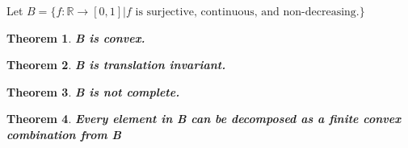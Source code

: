 \documentclass[12pt]{extarticle}
\theoremstyle{plain}
\newtheorem{thm}{Theorem}[section]
\theoremstyle{Definition}
\theoremstyle{Definition}
\theoremstyle{plain}
\begin{document}
	Let $B = \{f : \mathbb{R} \to [0,1] | f \text{ is surjective, continuous, and non-decreasing.}\}$ \\ 
	\begin{thm} \textbf{B is convex. } \\
		
	\end{thm}
	\begin{thm} \textbf{B is translation invariant.} \\
	
	\end{thm}
	\begin{thm} \textbf{B is not complete.} \\
	
	\end{thm}
	\begin{thm} \textbf{Every element in B can be decomposed as a finite convex combination from B} \\
	
	\end{thm}
\end{document}
